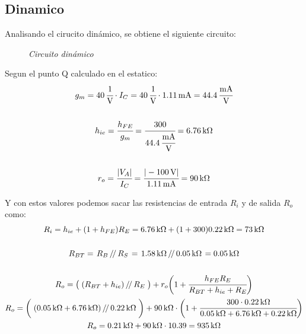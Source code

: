 \documentclass[a4paper,12pt]{article}
\newcommand{\parallelTwo}[2]{\left.#1\,\middle/\!\middle/\,#2\right.}
\newcommand{\mR}[1]{\SI{#1}{\kilo\ohm}}
\newcommand{\mI}[1]{\SI{#1}{\milli\ampere}}
\newcommand{\mV}[1]{\SI{#1}{\volt}}
\begin{document}
\subsection{Dinamico}
    Analisando el cirucito dinámico, se obtiene el siguiente circuito:
    \begin{figure}[H]
        \setlength{\abovecaptionskip}{0pt}
		\centering
		\captionsetup{labelformat=empty}
		\caption{\small{\textit{ Circuito dinámico }}}
    \end{figure}

    Segun el punto Q calculado en el estatico:
    \begin{gather*}
        g_m = \SI{40}{\cfrac{1}{\volt}} \cdot I_C = \SI{40}{\cfrac{1}{\volt}} \cdot \mI{1.11} = \SI{44.4}{\cfrac{mA}{V}}
        \\ \\
        h_{ie} = \cfrac{h_{FE}}{g_m} = \cfrac{300}{\SI{44.4}{\cfrac{mA}{V}}} = \mR{6.76}
        \\ \\
        r_o = \cfrac{| V_A |}{I_C} = \cfrac{|\mV{-100}|}{\mI{1.11}} = \mR{90}
    \end{gather*}

    Y con estos valores podemos sacar las resistencias de entrada $R_i$ y de salida $R_o$ como:
    \begin{gather*}
        R_i = h_{ie} + (1+h_{FE}) R_E = \mR{6.76} + (1+300) \mR{0.22} = \mR{73}
        \\ \\
        R_{BT} = \parallelTwo{R_B}{R_S} = \parallelTwo{\mR{1.58}}{\mR{0.05}} = \mR{0.05}
        \\ \\
        R_o = \big( \parallelTwo{(R_{BT} + h_{ie})}{R_E} \big) + r_o \bigg( 1 + \cfrac{h_{FE} R_E}{R_{BT} + h_{ie} + R_E} \bigg) \\
        R_o = \bigg( \parallelTwo{(\mR{0.05} + \mR{6.76})}{\mR{0.22}} \bigg) + 
            \mR{90} \cdot \bigg( 1 + \cfrac{300 \cdot \mR{0.22}}{\mR{0.05} + \mR{6.76} + \mR{0.22}} \bigg) \\
        R_o = \mR{0.21} + \mR{90} \cdot 10.39 = \mR{935}
    \end{gather*}
\end{document}
